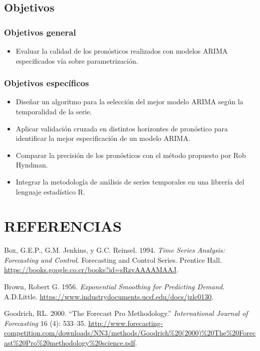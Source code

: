 \documentclass[12pt]{article}
\providecommand{\tightlist}{%
  \setlength{\itemsep}{0pt}\setlength{\parskip}{0pt}}
\begin{document}
\subsection{Objetivos}

\subsubsection{Objetivos general}

\begin{itemize}
\tightlist
\item
  Evaluar la calidad de los pronósticos realizados con modelos ARIMA
  especificados vía sobre parametrización.
\end{itemize}

\subsubsection{Objetivos específicos}

\begin{itemize}
\tightlist
\item
  Diseñar un algoritmo para la selección del mejor modelo ARIMA según la
  temporalidad de la serie.
\item
  Aplicar validación cruzada en distintos horizontes de pronóstico para
  identificar la mejor especificación de un modelo ARIMA.
\item
  Comparar la precisión de los pronósticos con el método propuesto por
  Rob Hyndman.
\item
  Integrar la metodología de análisis de series temporales en una
  librería del lenguaje estadístico R.
\end{itemize}

\section{REFERENCIAS}

\hypertarget{refs}{}
\leavevmode\hypertarget{ref-box-jenkins}{}%
Box, G.E.P., G.M. Jenkins, y G.C. Reinsel. 1994. \emph{Time Series
Analysis: Forecasting and Control}. Forecasting and Control Series.
Prentice Hall. \url{https://books.google.co.cr/books?id=sRzvAAAAMAAJ}.

\leavevmode\hypertarget{ref-brown}{}%
Brown, Robert G. 1956. \emph{Exponential Smoothing for Predicting
Demand}. A.D.Little.
\url{https://www.industrydocuments.ucsf.edu/docs/jzlc0130}.

\leavevmode\hypertarget{ref-forecastpro}{}%
Goodrich, RL. 2000. ``The Forecast Pro Methodology.''
\emph{International Journal of Forecasting} 16 (4): 533--35.
\url{http://www.forecasting-competition.com/downloads/NN3/methods/Goodrich\%20(2000)\%20The\%20Forecast\%20Pro\%20methodology\%20science.pdf}.
\end{document}
